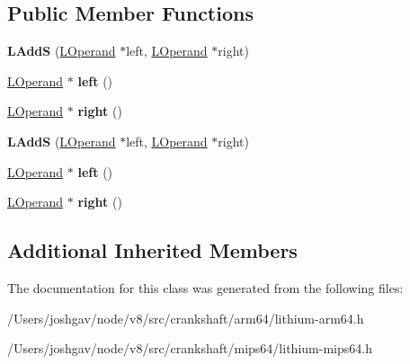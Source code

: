 \subsection*{Public Member Functions}
\begin{DoxyCompactItemize}
\item 
{\bfseries L\+AddS} (\hyperlink{classv8_1_1internal_1_1_l_operand}{L\+Operand} $\ast$left, \hyperlink{classv8_1_1internal_1_1_l_operand}{L\+Operand} $\ast$right)\hypertarget{classv8_1_1internal_1_1_l_add_s_aa8dc6af299a565d44b77bb08715fba07}{}\label{classv8_1_1internal_1_1_l_add_s_aa8dc6af299a565d44b77bb08715fba07}

\item 
\hyperlink{classv8_1_1internal_1_1_l_operand}{L\+Operand} $\ast$ {\bfseries left} ()\hypertarget{classv8_1_1internal_1_1_l_add_s_ada0ff1218c2924de916485c30b5a846f}{}\label{classv8_1_1internal_1_1_l_add_s_ada0ff1218c2924de916485c30b5a846f}

\item 
\hyperlink{classv8_1_1internal_1_1_l_operand}{L\+Operand} $\ast$ {\bfseries right} ()\hypertarget{classv8_1_1internal_1_1_l_add_s_aeb1020abf717a12fe4380d74f8e267ed}{}\label{classv8_1_1internal_1_1_l_add_s_aeb1020abf717a12fe4380d74f8e267ed}

\item 
{\bfseries L\+AddS} (\hyperlink{classv8_1_1internal_1_1_l_operand}{L\+Operand} $\ast$left, \hyperlink{classv8_1_1internal_1_1_l_operand}{L\+Operand} $\ast$right)\hypertarget{classv8_1_1internal_1_1_l_add_s_aa8dc6af299a565d44b77bb08715fba07}{}\label{classv8_1_1internal_1_1_l_add_s_aa8dc6af299a565d44b77bb08715fba07}

\item 
\hyperlink{classv8_1_1internal_1_1_l_operand}{L\+Operand} $\ast$ {\bfseries left} ()\hypertarget{classv8_1_1internal_1_1_l_add_s_ada0ff1218c2924de916485c30b5a846f}{}\label{classv8_1_1internal_1_1_l_add_s_ada0ff1218c2924de916485c30b5a846f}

\item 
\hyperlink{classv8_1_1internal_1_1_l_operand}{L\+Operand} $\ast$ {\bfseries right} ()\hypertarget{classv8_1_1internal_1_1_l_add_s_aeb1020abf717a12fe4380d74f8e267ed}{}\label{classv8_1_1internal_1_1_l_add_s_aeb1020abf717a12fe4380d74f8e267ed}

\end{DoxyCompactItemize}
\subsection*{Additional Inherited Members}


The documentation for this class was generated from the following files\+:\begin{DoxyCompactItemize}
\item 
/\+Users/joshgav/node/v8/src/crankshaft/arm64/lithium-\/arm64.\+h\item 
/\+Users/joshgav/node/v8/src/crankshaft/mips64/lithium-\/mips64.\+h\end{DoxyCompactItemize}
